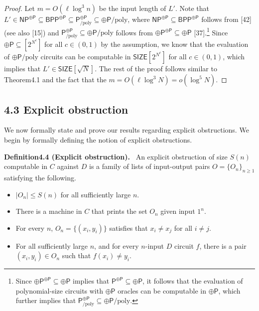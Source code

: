 \documentclass[10pt,a4paper]{article}
\newenvironment{authorclaim}[1]{\par\medskip\noindent\textbf{#1.}\ }{\par\medskip}
\begin{document}
\begin{proof}
Let $m=O(\ell\log^3n)$ be the input length of $L'$. Note that $L'\in\mathsf{NP}^{\oplus\mathsf P}\subseteq\mathsf{BPP}^{\oplus\mathsf P}\subseteq\mathsf P_{/\mathrm{poly}}^{\oplus\mathsf P}\subseteq\oplus\mathsf P/\mathrm{poly}$, where $\mathsf{NP}^{\oplus\mathsf P}\subseteq\mathsf{BPP}^{\oplus\mathsf P}$ follows from [42] (see also [15]) and $\mathsf P_{/\mathrm{poly}}^{\oplus\mathsf P}\subseteq\oplus\mathsf P/\mathrm{poly}$ follows from $\oplus\mathsf P^{\oplus\mathsf P}\subseteq\oplus\mathsf P$ [37].\footnote{Since $\oplus\mathsf P^{\oplus\mathsf P}\subseteq\oplus\mathsf P$ implies that $\mathsf P^{\oplus\mathsf P}\subseteq\oplus\mathsf P$, it follows that the evaluation of polynomial-size circuits with $\oplus\mathsf P$ oracles can be computable in $\oplus\mathsf P$, which further implies that $\mathsf P_{/\mathrm{poly}}^{\oplus\mathsf P}\subseteq\oplus\mathsf P/\mathrm{poly}$.} Since $\oplus\mathsf P\subseteq[2^{N^c}]$ for all $c\in(0,1)$ by the assumption, we know that the evaluation of $\oplus\mathsf P/\mathrm{poly}$ circuits can be computable in $\mathsf{SIZE}[2^{N^c}]$ for all $c\in(0,1)$, which implies that $L'\in\mathsf{SIZE}[\sqrt N]$. The rest of the proof follows similar to Theorem4.1 and the fact that the $m=O(\ell\log^3N)=o(\log^5N)$.
\end{proof}
\subsection*{4.3 Explicit obstruction}
We now formally state and prove our results regarding explicit obstructions. We begin by formally defining the notion of explicit obstructions.
\begin{authorclaim}{Definition4.4 (Explicit obstruction)}
An explicit obstruction of size $S(n)$ computable in $C$ against $D$ is a family of lists of input-output pairs $O=\{O_n\}_{n\ge1}$ satisfying the following.
\begin{itemize}
\item $|O_n|\le S(n)$ for all sufficiently large $n$.
\item There is a machine in $C$ that prints the set $O_n$ given input $1^n$.
\item For every $n$, $O_n=\{(x_i,y_i)\}$ satisfies that $x_i\ne x_j$ for all $i\ne j$.
\item For all sufficiently large $n$, and for every $n$-input $D$ circuit $f$, there is a pair $(x_i,y_i)\in O_n$ such that $f(x_i)\ne y_i$.
\end{itemize}
\end{authorclaim}
\end{document}
